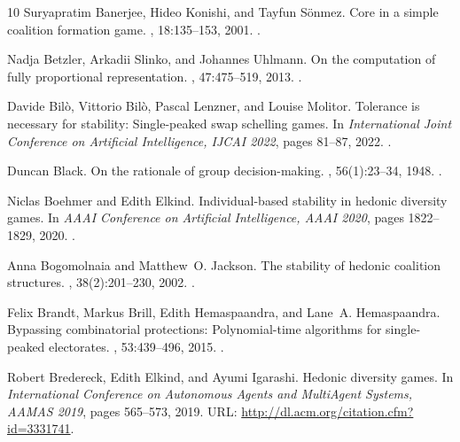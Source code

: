 \documentclass[a4paper]{article}
\begin{document}
\begin{thebibliography}{10}
Suryapratim Banerjee, Hideo Konishi, and Tayfun S{\"o}nmez.
\newblock Core in a simple coalition formation game.
, 18:135--153, 2001.
\newblock \href {https://doi.org/10.1007/s003550000067} {}.

Nadja Betzler, Arkadii Slinko, and Johannes Uhlmann.
\newblock On the computation of fully proportional representation.
, 47:475--519, 2013.
\newblock \href {https://doi.org/10.1613/JAIR.3896} {}.

Davide Bil{\`{o}}, Vittorio Bil{\`{o}}, Pascal Lenzner, and Louise Molitor.
\newblock Tolerance is necessary for stability: Single-peaked swap schelling games.
\newblock In {\em International Joint Conference on Artificial Intelligence, {IJCAI} 2022}, pages 81--87, 2022.
\newblock \href {https://doi.org/10.24963/IJCAI.2022/12} {}.

Duncan Black.
\newblock On the rationale of group decision-making.
, 56(1):23--34, 1948.
\newblock \href {https://doi.org/10.1086/256633} {}.

Niclas Boehmer and Edith Elkind.
\newblock Individual-based stability in hedonic diversity games.
\newblock In {\em {AAAI} Conference on Artificial Intelligence, {AAAI} 2020}, pages 1822--1829, 2020.
\newblock \href {https://doi.org/10.1609/AAAI.V34I02.5549} {}.

Anna Bogomolnaia and Matthew~O. Jackson.
\newblock The stability of hedonic coalition structures.
, 38(2):201--230, 2002.
\newblock \href {https://doi.org/10.1006/GAME.2001.0877} {}.

Felix Brandt, Markus Brill, Edith Hemaspaandra, and Lane~A. Hemaspaandra.
\newblock Bypassing combinatorial protections: Polynomial-time algorithms for single-peaked electorates.
, 53:439--496, 2015.
\newblock \href {https://doi.org/10.1613/JAIR.4647} {}.

Robert Bredereck, Edith Elkind, and Ayumi Igarashi.
\newblock Hedonic diversity games.
\newblock In {\em International Conference on Autonomous Agents and MultiAgent Systems, {AAMAS} 2019}, pages 565--573, 2019.
\newblock URL: \url{http://dl.acm.org/citation.cfm?id=3331741}.


\end{thebibliography}
\end{document}
